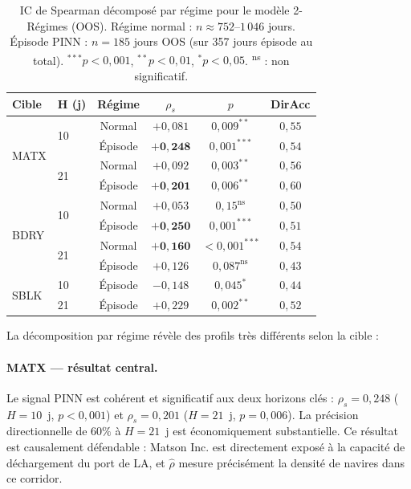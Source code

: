 \begin{table}[ht]
\centering
\caption{IC de Spearman décomposé par régime pour le modèle 2-Régimes (OOS).
Régime normal : $n \approx 752$--$1\,046$ jours. Épisode PINN : $n = 185$
jours OOS (sur 357 jours épisode au total). $^{***}p<0{,}001$, $^{**}p<0{,}01$,
$^{*}p<0{,}05$. \textsuperscript{ns} : non significatif.}
\label{tab:by_regime}
\small
\begin{tabular}{llcccc}
\toprule
\textbf{Cible} & \textbf{H (j)} & \textbf{Régime} & $\rho_s$ & $p$ &
\textbf{DirAcc} \\
\midrule
\multirow{4}{*}{MATX}
  & \multirow{2}{*}{10} & Normal  & $+0{,}081$ & $0{,}009^{**}$ & $0{,}55$ \\
  &                     & Épisode & $\mathbf{+0{,}248}$ & $0{,}001^{***}$ & $0{,}54$ \\
  \cmidrule{2-6}
  & \multirow{2}{*}{21} & Normal  & $+0{,}092$ & $0{,}003^{**}$ & $0{,}56$ \\
  &                     & Épisode & $\mathbf{+0{,}201}$ & $0{,}006^{**}$ & $0{,}60$ \\
\midrule
\multirow{4}{*}{BDRY}
  & \multirow{2}{*}{10} & Normal  & $+0{,}053$ & $0{,}15^{\text{ns}}$ & $0{,}50$ \\
  &                     & Épisode & $\mathbf{+0{,}250}$ & $0{,}001^{***}$ & $0{,}51$ \\
  \cmidrule{2-6}
  & \multirow{2}{*}{21} & Normal  & $\mathbf{+0{,}160}$ & $<0{,}001^{***}$ & $0{,}54$ \\
  &                     & Épisode & $+0{,}126$ & $0{,}087^{\text{ns}}$ & $0{,}43$ \\
\midrule
\multirow{2}{*}{SBLK}
  & 10 & Épisode & $-0{,}148$ & $0{,}045^{*}$ & $0{,}44$ \\
  & 21 & Épisode & $+0{,}229$ & $0{,}002^{**}$ & $0{,}52$ \\
\bottomrule
\end{tabular}
\end{table}

\noindent
La décomposition par régime révèle des profils très différents selon la cible :

\paragraph{MATX — résultat central.}
Le signal PINN est cohérent et significatif aux deux horizons clés :
$\rho_s = 0{,}248$ ($H = 10$~j, $p < 0{,}001$) et $\rho_s = 0{,}201$
($H = 21$~j, $p = 0{,}006$). La précision directionnelle de $60\%$ à
$H = 21$~j est économiquement substantielle. Ce résultat est causalement
défendable : Matson Inc. est directement exposé à la capacité de déchargement
du port de LA, et $\hat{\rho}$ mesure précisément la densité de navires dans
ce corridor.

